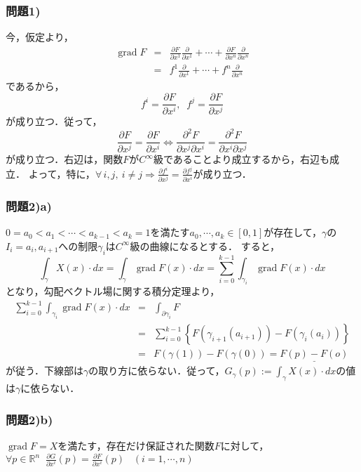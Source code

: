 \documentclass[dvipdfmx,uplatex]{jsarticle}
\DeclareMathOperator{\grad}{\mathrm{grad}}
\theoremstyle{definition}
\theoremstyle{StatementsWithStar}
\theoremstyle{StatementsWithStar2}
\theoremstyle{StatementsWithStar3}
\theoremstyle{StatementsWithCCirc}
\theoremstyle{definition}
\begin{document}
\subsubsection*{問題1)}
今，仮定より，
\begin{eqnarray*}
    \grad F&=& \frac{\partial F}{\partial x^1}\frac{\partial}{\partial x^1}+\cdots +\frac{\partial F}{\partial x^n}\frac{\partial}{\partial x^n} \\
    &=& f^1\frac{\partial}{\partial x^1}+\cdots+f^n\frac{\partial}{\partial x^n}
\end{eqnarray*}
であるから，
\[ f^i=\frac{\partial F}{\partial x^i},\;\; f^j=\frac{\partial F}{\partial x^j} \]
が成り立つ．従って，
\[ \frac{\partial F}{\partial x^j}=\frac{\partial F}{\partial x^i}\Leftrightarrow \frac{\partial^2 F}{\partial x^j\partial x^i}=\frac{\partial^2 F}{\partial x^i\partial x^j} \]
が成り立つ．右辺は，関数$F$が$C^\infty$級であることより成立するから，右辺も成立．
よって，特に，$\forall\,i,j,\ i\neq j\Rightarrow\frac{\partial f^i}{\partial x^j}=\frac{\partial f^j}{\partial x^i}$が成り立つ．
\rightline{$\blacksquare$}

\subsubsection*{問題2)a)}

$0=a_0<a_1<\cdots<a_{k-1}<a_k=1$を満たす$a_0,\cdots,a_k\in [0,1]$が存在して，$\gamma$の$I_i={a_i,a_{i+1}}$への制限$\gamma_i$は$C^\infty$級の曲線になるとする．
すると，
\[ \int_\gamma X(x)\cdot dx=\int_\gamma\grad F(x)\cdot dx = \sum^{k-1}_{i=0}\int_{\gamma_i}\grad F(x)\cdot dx \]
となり，勾配ベクトル場に関する積分定理より，
\begin{eqnarray*}
    \sum^{k-1}_{i=0}\int_{\gamma_i}\grad F(x)\cdot dx &=& \int_{\partial \gamma_i}F \\
    &=& \sum^{k-1}_{i=0}\left\{ F(\gamma_{i+1}(a_{i+1}))-F(\gamma_i(a_i)) \right\} \\
    &=& F(\gamma(1))-F(\gamma(0)) = \underline{F(p)-F(o)}
\end{eqnarray*}
が従う．下線部は$\gamma$の取り方に依らない．従って，$G_\gamma(p):=\int_\gamma X(x)\cdot dx$の値は$\gamma$に依らない．

\subsubsection*{問題2)b)}

$\grad F=X$を満たす，存在だけ保証された関数$F$に対して，$\forall p\in\mathbb{R}^n\;\;\frac{\partial G}{\partial x^i}(p)=\frac{\partial F}{\partial x^i}(p) \;\;\; (i=1,\cdots,n)$
\end{document}
